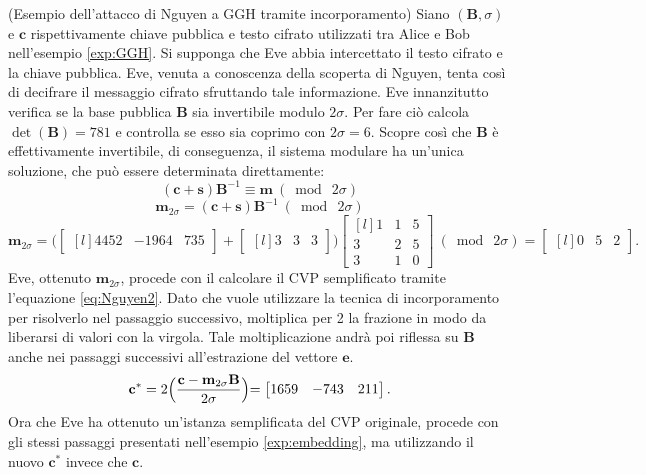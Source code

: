 \begin{exmp}(Esempio dell'attacco di Nguyen a GGH tramite incorporamento) 
Siano $(\mathbf{B}, \sigma)$ e $\mathbf{c}$ rispettivamente chiave pubblica e testo cifrato
utilizzati tra Alice e Bob nell'esempio \ref{exp:GGH}. Si supponga che Eve abbia intercettato 
il testo cifrato e la chiave pubblica. Eve, venuta a conoscenza della scoperta di Nguyen, 
tenta così di decifrare il messaggio cifrato sfruttando tale informazione.
Eve innanzitutto verifica
se la base pubblica $\mathbf{B}$ sia invertibile modulo $2\sigma$. Per fare ciò calcola 
$\det(\mathbf{B}) = 781$ e controlla se esso sia coprimo con $2\sigma=6$. Scopre così che 
$\mathbf{B}$ è effettivamente invertibile, di conseguenza, il sistema modulare ha un'unica 
soluzione, che può essere determinata direttamente:
\[
    (\mathbf{c}+\mathbf{s})\mathbf{B}^{-1} \equiv \mathbf{m} \ (\bmod \ 2\sigma)
\]
\[
    \mathbf{m}_{2\sigma} = (\mathbf{c}+\mathbf{s})\mathbf{B}^{-1} \ (\bmod \ 2\sigma)
\]
\begin{equation*}
    \mathbf{m}_{2\sigma} =
    \Biggl(
    \begin{bmatrix*}[l]
        4452 & -1964 & 735
    \end{bmatrix*}
    +
    \begin{bmatrix*}[l]
        3 & 3 & 3
    \end{bmatrix*}
    \Biggl)
    \begin{bmatrix*}[l]
        1 & 1 & 5\\
        3 & 2 & 5\\
        3 & 1 & 0
    \end{bmatrix*}
     \ (\bmod \ 2\sigma)
    =
    \begin{bmatrix*}[l]
        0 & 5 & 2
    \end{bmatrix*}.
\end{equation*}
Eve, ottenuto $\mathbf{m}_{2\sigma}$, procede con il calcolare il CVP semplificato tramite
l'equazione \ref{eq:Nguyen2}. Dato che vuole utilizzare la tecnica di incorporamento per
risolverlo nel passaggio successivo, moltiplica per 2 la frazione in modo da liberarsi di 
valori con la virgola. Tale moltiplicazione andrà poi riflessa su $\mathbf{B}$ anche nei 
passaggi successivi all'estrazione del vettore $\mathbf{e}$.
\[
    \mathbf{c}^* = 2 \Bigl(\frac{\mathbf{c} - \mathbf{m}_{2\sigma}\mathbf{B}}{2\sigma}\Bigl)
    = 
    \begin{bmatrix*}[l]
        1659 & -743 & 211
    \end{bmatrix*}.
\]
Ora che Eve ha ottenuto un'istanza semplificata del CVP originale, procede con gli stessi
passaggi presentati nell'esempio \ref{exp:embedding}, ma utilizzando il nuovo $\mathbf{c}^*$
invece che $\mathbf{c}$.


\end{exmp}
